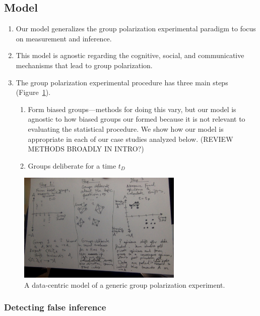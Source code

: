 \documentclass[11pt,letterpaper]{article}
\begin{document}
\subsection{Model}
\begin{enumerate}
  \item Our model generalizes the group polarization experimental paradigm to 
    focus on measurement and inference. 
    
  \item 
    This model is agnostic regarding the cognitive, social, and
    communicative mechanisms that lead to group polarization.

  \item
    The group polarization experimental procedure has three main steps
    (Figure~\ref{fig:modelDiagram}).
    \begin{enumerate}
      \item 
        Form biased groups---methods for doing this vary, but our model
        is agnostic to how biased groups our formed because it is not relevant
        to evaluating the statistical procedure. We show how our model is
        appropriate in each of our case studies analyzed below. 
        (REVIEW METHODS BROADLY IN INTRO?)
      \item 
        Groups deliberate for a time $t_D$
    \end{enumerate}
\end{enumerate}

\begin{figure}
  \centering
  \includegraphics[width=0.7\textwidth]{Figures/ModelDiagramSketch.jpg}
  \caption{A data-centric model of a generic group polarization experiment.}
  \label{fig:modelDiagram}
\end{figure}
\subsubsection{Detecting false inference}
\end{document}
